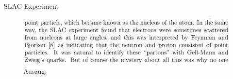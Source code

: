 \documentclass[t,9pt]{beamer}
\begin{document}
        \begin{frame}{SLAC Experiment}
                \begin{figure}
                        \includegraphics[width=\textwidth]{prosi_making_of_standard_model_identify_partons_quarks.png}
                        \caption{Auszug:\cite{Weinberg2004}} \end{figure}
        \end{frame}\fi %
                
\end{document}
